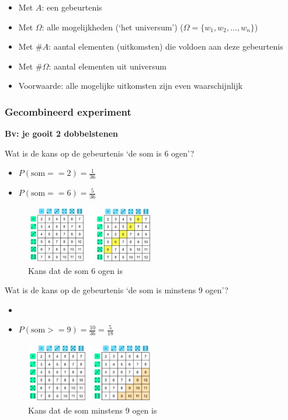 \documentclass{article}
\begin{document}
\begin{itemize}
    \item Met $A$: een gebeurtenis
    \item Met $\Omega$: alle mogelijkheden (`het universum') ($\Omega = \{w_1, w_2, \dots, w_n\}$)
    \item Met $\#A$: aantal elementen (uitkomsten) die voldoen aan deze gebeurtenis
    \item Met $\#\Omega$: aantal elementen uit universum
    \item Voorwaarde: alle mogelijke uitkomsten zijn even waarschijnlijk
\end{itemize}

\subsubsection{Gecombineerd experiment}

\textbf{Bv: je gooit 2 dobbelstenen}

Wat is de kans op de gebeurtenis `de som is 6 ogen'?

\begin{itemize}
    \item $P(\text{som} == 2) = \frac{1}{36}$
    \item $P(\text{som} == 6) = \frac{5}{36}$
\end{itemize}

\begin{figure}[H]
    \centering
    \includegraphics[width=0.5\textwidth]{gecombineerd-experiment.png}
    \caption{Kans dat de som 6 ogen is}
\end{figure}

Wat is de kans op de gebeurtenis `de som is minstens 9 ogen'?

\begin{itemize}
    \item \item $P(\text{som} >= 9) = \frac{10}{36} = \frac{5}{18}$
\end{itemize}

\begin{figure}[H]
    \centering
    \includegraphics[width=0.5\textwidth]{gecombineerd-experiment2.png}
    \caption{Kans dat de som minstens 9 ogen is}
\end{figure}
\end{document}
